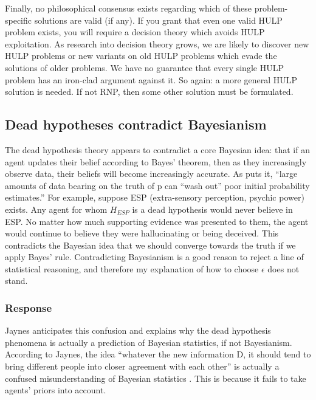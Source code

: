 \documentclass{article}
\begin{document}
Finally, no philosophical consensus exists regarding which of these problem-specific solutions are valid (if any). If you grant that even one valid HULP problem exists, you will require a decision theory which avoids HULP exploitation. As research into decision theory grows, we are likely to discover new HULP problems \textemdash{} or new variants on old HULP problems \textemdash{} which evade the solutions of older problems. We have no guarantee that every single HULP problem has an iron-clad argument against it. So again: a more general HULP solution is needed. If not RNP, then some other solution must be formulated.

\subsection{Dead hypotheses contradict Bayesianism} 

The dead hypothesis theory appears to contradict a core Bayesian idea: that if an agent updates their belief according to Bayes' theorem, then as they increasingly observe data, their beliefs will become increasingly accurate. As \citet[pg. 56]{resnik1987choices} puts it, ``large amounts of data bearing on the truth of p can ``wash out'' poor initial probability estimates.'' For example, suppose ESP (extra-sensory perception, psychic power) exists. Any agent for whom \(H_{ESP}\) is a dead hypothesis would never believe in ESP. No matter how much supporting evidence was presented to them, the agent would continue to believe they were hallucinating or being deceived. This contradicts the Bayesian idea that we should converge towards the truth if we apply Bayes' rule. Contradicting Bayesianism is a good reason to reject a line of statistical reasoning, and therefore my explanation of how to choose \(\epsilon\) does not stand.

\subsubsection*{Response}

Jaynes anticipates this confusion and explains why the dead hypothesis phenomena is actually a prediction of Bayesian statistics, if not Bayesianism. According to Jaynes, the idea ``whatever the new information D, it should tend to bring different people into closer agreement with each other'' is actually a confused misunderstanding of Bayesian statistics \citep[pg. 127]{jaynes2003probability}. This is because it fails to take agents' priors into account. 
\end{document}
